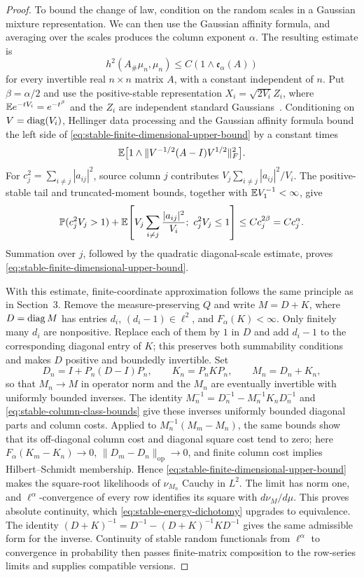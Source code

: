 \begin{proof}
To bound the change of law, condition on the random scales in a Gaussian
mixture representation. We can then use the Gaussian affinity formula,
and averaging over the scales produces the column exponent \(\alpha\).
The resulting estimate is
\begin{equation}
 h^2(A_\#\mu_n,\mu_n)
 \le C(1\wedge\mathfrak e_\alpha(A))
 \label{eq:stable-finite-dimensional-upper-bound}
\end{equation}
for every invertible real \(n\times n\) matrix \(A\), with a constant
independent of \(n\).
Put \(\beta=\alpha/2\) and use the positive-stable representation
\(X_i=\sqrt{2V_i}Z_i\), where
\(\mathbb E e^{-tV_i}=e^{-t^\beta}\) and the \(Z_i\) are independent standard
Gaussians~\cite{sato1999levy,samorodnitsky1994stable}.
Conditioning on \(V=\operatorname{diag}(V_i)\), Hellinger data processing and the Gaussian
affinity formula bound the left side of
\eqref{eq:stable-finite-dimensional-upper-bound} by a constant times
\[
 \mathbb E\bigl[1\wedge\|V^{-1/2}(A-I)V^{1/2}\|_F^2\bigr].
\]
For \(c_j^2=\sum_{i\ne j}|a_{ij}|^2\), source column \(j\) contributes
\(V_j\sum_{i\ne j}|a_{ij}|^2/V_i\).  The positive-stable tail and
truncated-moment bounds, together with \(\mathbb E V_1^{-1}<\infty\), give
\[
 \mathbb P(c_j^2V_j>1)+\mathbb E\!\left[V_j\sum_{i\ne j}\frac{|a_{ij}|^2}{V_i};\ c_j^2V_j\le1\right]
 \le C c_j^{2\beta}=C c_j^\alpha.
\]
Summation over \(j\), followed by the quadratic diagonal-scale estimate, proves
\eqref{eq:stable-finite-dimensional-upper-bound}.

With this estimate, finite-coordinate approximation follows the same
principle as in Section~3. Remove the measure-preserving \(Q\) and write
\(M=D+K\), where \(D=\operatorname{diag} M\) has entries \(d_i\),
\((d_i-1)\in\ell^2\), and
\(F_\alpha(K)<\infty\).
Only finitely many \(d_i\) are nonpositive.  Replace each of them by \(1\) in
\(D\) and add \(d_i-1\) to the corresponding diagonal entry of \(K\); this
preserves both summability conditions and makes \(D\) positive and boundedly
invertible.
Set
\[
 D_n=I+P_n(D-I)P_n,
 \qquad K_n=P_nKP_n,
 \qquad M_n=D_n+K_n,
\]
so that \(M_n\to M\) in operator norm and the \(M_n\) are eventually
invertible with uniformly bounded inverses.  The identity
\(M_n^{-1}=D_n^{-1}-M_n^{-1}K_nD_n^{-1}\) and
\eqref{eq:stable-column-class-bounds} give these inverses uniformly bounded
diagonal parts and column costs.  Applied to
\(M_n^{-1}(M_m-M_n)\), the same bounds show that its off-diagonal column cost
and diagonal square cost tend to zero; here
\(F_\alpha(K_m-K_n)\to0\), \(\|D_m-D_n\|_{\mathrm{op}}\to0\), and finite column
cost implies Hilbert--Schmidt membership.  Hence
\eqref{eq:stable-finite-dimensional-upper-bound} makes the square-root
likelihoods of \(\nu_{M_n}\) Cauchy in \(L^2\).  The limit has norm
one, and \(\ell^\alpha\)-convergence of every row identifies its square with
\(d\nu_{M}/d\mu\).  This proves absolute continuity, which
\eqref{eq:stable-energy-dichotomy} upgrades to equivalence.
The identity
\((D+K)^{-1}=D^{-1}-(D+K)^{-1}KD^{-1}\) gives the same admissible form for the
inverse.  Continuity of stable random functionals from \(\ell^\alpha\) to
convergence in probability then passes finite-matrix composition to the
row-series limits and supplies compatible versions.


\end{proof}
